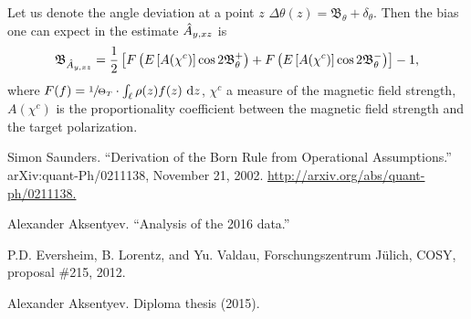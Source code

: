 \documentclass{article}
\begin{document}
\newcommand{\bias}[1]{\mathfrak{B}_{#1}}
\newcommand{\rand}[1]{\delta_{#1}}
Let us denote the angle deviation at a point $z$ $\Delta\theta(z) = \bias{\theta} + \rand{\theta}$. Then the bias one can expect in the estimate $\Ayxz*$ is~\cite{Diploma}
\begin{equation}
	\bias{\Ayxz*} = \frac{1}{2}\bkt*{F\bkt{\Xpct{A(\chi^c)}\cos2\bias{\theta}^+} + F\bkt{\Xpct{A(\chi^c)}\cos2\bias{\theta}^-}} - 1,
\end{equation}
where $F(f) = \sfrac{1}{\Thick[T]}\cdot\int_{\Lcell}\rho(z) f(z)~ \td z$, $\chi^c$ a measure of the magnetic field strength, $A(\chi^c)$ is the proportionality coefficient between the magnetic field strength and the target polarization.

\begin{thebibliography}{9}
	Simon Saunders. ``Derivation of the Born Rule from Operational Assumptions.'' arXiv:quant-Ph/0211138, November 21, 2002. \url{http://arxiv.org/abs/quant-ph/0211138.}
	
	Alexander Aksentyev. ``Analysis of the 2016 data.''
	
	P.D. Eversheim, B. Lorentz, and Yu. Valdau, Forschungszentrum J\"ulich, COSY, proposal \#215, 2012.
	
	Alexander Aksentyev. Diploma thesis (2015).
\end{thebibliography}
\end{document}
